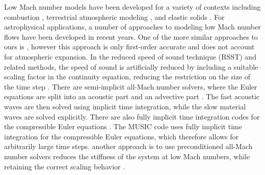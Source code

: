 Low Mach number models 
have been developed for a variety of contexts
including combustion \citep{day2000numerical}, terrestrial atmospheric
modeling \citep{durran:1989,oneill:2014,duarte2015low}, and elastic
solids \citep{abbate2017all}.  
For astrophysical applications, a
number of approaches to modeling low Mach number flows have been
developed in recent years.  One of the more similar approaches to ours is
\cite{Lin:2006}, however this approach is only first-order accurate and does
not account for atmospheric expansion.
In the reduced speed of sound technique (RSST) and related
methods, the speed of sound is artificially reduced by including a
suitable scaling factor in the continuity equation, reducing the
restriction on the size of the time step
\citep{Rempel2005,Hotta2012,Wang2015,Takeyama2017,Iijima2018}.
There are  semi-implicit all-Mach
number solvers, where the Euler equations are split into an acoustic
part and an advective part
\citep{Kwatra2009,Degond2009,Cordier2012,Haack2012,Happenhofer2013,Chalons2016,Padioleau2019}.
The fast acoustic waves are then solved using implicit time
integration, while the slow material waves are solved explicitly.
There are also fully implicit time integration codes for the
compressible Euler equations
\citep{kifonidis:2012,Viallet2015,Goffrey2016}.
The MUSIC code
uses fully implicit time integration for the compressible Euler
equations, which therefore allows for arbitrarily large time steps.
another approach is to use preconditioned all-Mach number solvers
\citep{Miczek2014,Barsukow2016}
 reduces the stiffness of
the system at low Mach numbers, while retaining the correct scaling
behavior .


